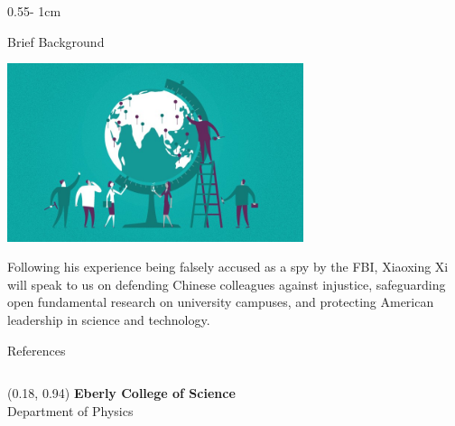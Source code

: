 \documentclass{../psuposter}
\begin{document}
\begin{frame}
\begin{columns}[t, totalwidth=\textwidth]
\begin{column}{0.55\textwidth - 1cm}
\begin{block}{Brief Background}
        \begin{center}
		   	\includegraphics[width=0.65\textwidth]{images/background.jpg}    		
    	\end{center}
		Following his experience being falsely accused as a spy by the FBI, Xiaoxing Xi will speak to us on defending Chinese colleagues against injustice, safeguarding open fundamental research on university campuses, and protecting American leadership in science and technology.  
    \end{block}


    \begin{block}{References}
    \nocite{*}
        
%        
		
    \end{block}

\end{column}
\end{columns}


\begin{textblock}{0.5}(0.18, 0.94)
    \color{white}
    \sffamily
    \textbf{Eberly College of Science}
    \\
    Department of Physics
\end{textblock}


\end{frame}
\end{document}
